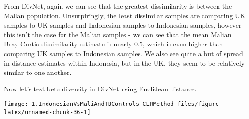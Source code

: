 \documentclass[]{article}
\newenvironment{Shaded}{\begin{snugshade}}{\end{snugshade}}
\newcommand{\CommentTok}[1]{\textcolor[rgb]{0.56,0.35,0.01}{\textit{#1}}}
\newcommand{\DataTypeTok}[1]{\textcolor[rgb]{0.13,0.29,0.53}{#1}}
\newcommand{\FloatTok}[1]{\textcolor[rgb]{0.00,0.00,0.81}{#1}}
\newcommand{\KeywordTok}[1]{\textcolor[rgb]{0.13,0.29,0.53}{\textbf{#1}}}
\newcommand{\NormalTok}[1]{#1}
\newcommand{\OperatorTok}[1]{\textcolor[rgb]{0.81,0.36,0.00}{\textbf{#1}}}
\newcommand{\StringTok}[1]{\textcolor[rgb]{0.31,0.60,0.02}{#1}}
\begin{document}
From DivNet, again we can see that the greatest dissimilarity is between
the Malian population. Unsurpiringly, the least dissimilar samples are
comparing UK samples to UK samples and Indonesian samples to Indonesian
samples, however this isn't the case for the Malian samples - we can see
that the mean Malian Bray-Curtis dissimilarity estimate is nearly 0.5,
which is even higher than comparing UK samples to Indonesian samples. We
also see quite a but of spread in distance estimates within Indonesia,
but in the UK, they seem to be relatively similar to one another.

Now let's test beta diversity in DivNet using Euclidean distance.

\begin{Shaded}
\end{Shaded}

\begin{center}\texttt{[image: 1.IndonesianVsMaliAndTBControls\_CLRMethod\_files/figure-latex/unnamed-chunk-36-1]} \end{center}
\end{document}
